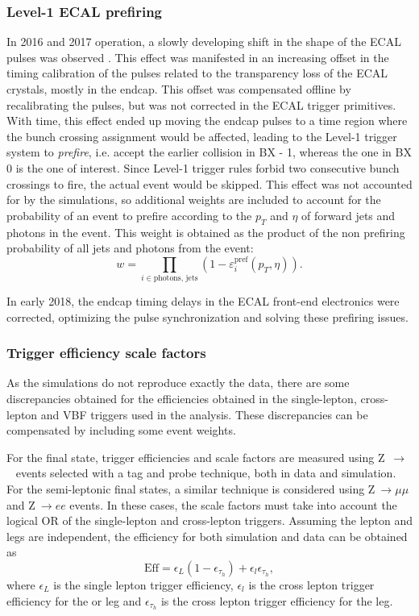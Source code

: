 \documentclass[../main.tex]{subfiles}
\begin{document}
\subsubsection*{Level-1 ECAL prefiring}

In 2016 and 2017 operation, a slowly developing shift in the shape of the ECAL pulses was observed \cite{intro:l1_13tev}. This effect was manifested in an increasing offset in the timing calibration of the pulses related to the transparency loss of the ECAL crystals, mostly in the endcap. This offset was compensated offline by recalibrating the pulses, but was not corrected in the ECAL trigger primitives. With time, this effect ended up moving the endcap pulses to a time region where the bunch crossing assignment would be affected, leading to the Level-1 trigger system to \textit{prefire}, i.e. accept the earlier collision in BX - 1, whereas the one in BX 0 is the one of interest. Since Level-1 trigger rules forbid two consecutive bunch crossings to fire, the actual event would be skipped. This effect was not accounted for by the simulations, so additional weights are included to account for the probability of an event to prefire according to the $p_T$ and $\eta$ of forward jets and photons in the event. This weight is obtained as the product of the non prefiring probability of all jets and photons from the event:
\begin{equation}
w = \prod_{i\in \text{photons, jets}} (1 - \varepsilon_i^\text{pref}(p_T, \eta)).
\end{equation}

In early 2018, the endcap timing delays in the ECAL front-end electronics were corrected, optimizing the pulse synchronization and solving these prefiring issues.

\subsubsection*{Trigger efficiency scale factors}
\label{hh:sec:trigger_sf}

As the simulations do not reproduce exactly the data, there are some discrepancies obtained for the efficiencies obtained in the single-lepton, cross-lepton and VBF triggers used in the analysis. These discrepancies can be compensated by including some event weights.

For the \tauh\tauh{} final state, trigger efficiencies and scale factors are measured using Z~$\to$~\taumu\tauh{} events selected with a tag and probe technique, both in data and simulation. For the semi-leptonic final states, a similar technique is considered using Z$~\to\mu\mu$ and Z$~\to ee$ events. In these cases, the scale factors must take into account the logical OR of the single-lepton and cross-lepton triggers. Assuming the lepton and \tauh{} legs are independent, the efficiency for both simulation and data can be obtained as
\begin{equation}
\text{Eff} = \epsilon_L(1-\epsilon_{\tau_h}) +  \epsilon_l\epsilon_{\tau_h},
\end{equation}
where $\epsilon_L$ is the single lepton trigger efficiency, $\epsilon_l$ is the cross lepton trigger efficiency for the \taue{} or \taumu{} leg and $\epsilon_{\tau_h}$ is the cross lepton trigger efficiency for the \tauh{} leg.
\end{document}
